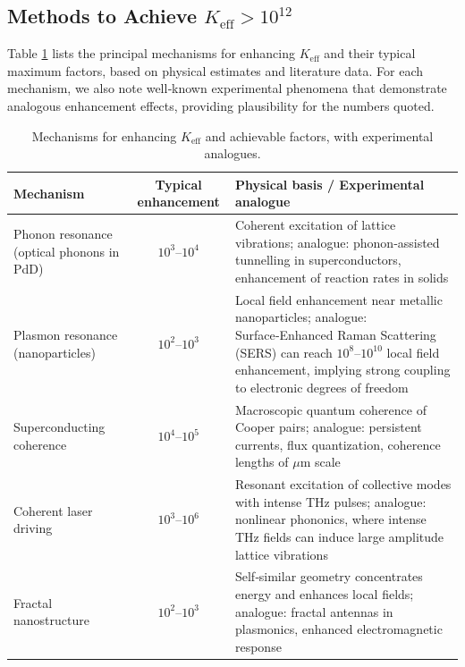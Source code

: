 \documentclass[12pt]{article}
\theoremstyle{remark}
\newcommand{\Keff}{K_{\mathrm{eff}}}
\begin{document}
	\subsection{Methods to Achieve \(\Keff > 10^{12}\)}
	
	Table \ref{tab:enhancement} lists the principal mechanisms for enhancing \(\Keff\) and their typical maximum factors, based on physical estimates and literature data. For each mechanism, we also note well‑known experimental phenomena that demonstrate analogous enhancement effects, providing plausibility for the numbers quoted.
	
\begin{table}[htbp]
	\centering
	\caption{Mechanisms for enhancing \(\Keff\) and achievable factors, with experimental analogues.}
	\label{tab:enhancement}
	\small
	\begin{tabularx}{\textwidth}{>{\raggedright\arraybackslash}p{3.2cm} c X}
		\toprule
		\textbf{Mechanism} & \textbf{Typical enhancement} & \textbf{Physical basis / Experimental analogue} \\
		\midrule
		Phonon resonance (optical phonons in PdD) & \(10^3\)–\(10^4\) & Coherent excitation of lattice vibrations; analogue: phonon‑assisted tunnelling in superconductors, enhancement of reaction rates in solids \cite{Storms2014, Tinkham2004} \\
		Plasmon resonance (nanoparticles) & \(10^2\)–\(10^3\) & Local field enhancement near metallic nanoparticles; analogue: Surface‑Enhanced Raman Scattering (SERS) can reach \(10^8\)–\(10^{10}\) local field enhancement, implying strong coupling to electronic degrees of freedom \cite{Maier2007, SERS} \\
		Superconducting coherence & \(10^4\)–\(10^5\) & Macroscopic quantum coherence of Cooper pairs; analogue: persistent currents, flux quantization, coherence lengths of \(\mu\)m scale \cite{Tinkham2004} \\
		Coherent laser driving & \(10^3\)–\(10^6\) & Resonant excitation of collective modes with intense THz pulses; analogue: nonlinear phononics, where intense THz fields can induce large amplitude lattice vibrations \cite{Kampfrath2011} \\
		Fractal nanostructure & \(10^2\)–\(10^3\) & Self‑similar geometry concentrates energy and enhances local fields; analogue: fractal antennas in plasmonics, enhanced electromagnetic response \cite{Mandelbrot1982, fractal-antenna} \\
		\bottomrule
	\end{tabularx}
\end{table}
	
\end{document}
